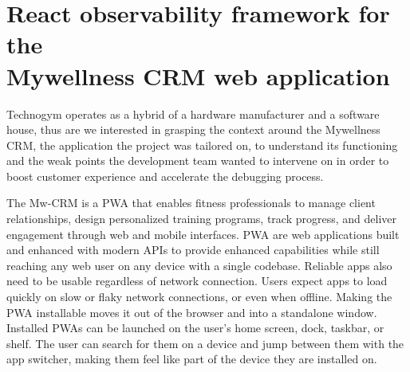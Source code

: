 \documentclass[12pt,a4paper,openright,twoside]{book}
\begin{document}
\section{React observability framework for the \\ Mywellness CRM web application}

Technogym operates as a hybrid of a hardware manufacturer and a software house, thus are we interested in grasping the context around the Mywellness CRM, the application the project was tailored on, to understand its functioning and the weak points the development team wanted to intervene on in order to boost customer experience and accelerate the debugging process. 

The Mw-CRM is a \ac{PWA} that enables fitness professionals to manage client relationships, design personalized training programs, track progress, and deliver engagement through web and mobile interfaces. \ac{PWA} \cite{webdev-pwa} are web applications built and enhanced with modern APIs to provide enhanced capabilities while still reaching any web user on any device with a single codebase. Reliable apps also need to be usable regardless of network connection. Users expect apps to load quickly on slow or flaky network connections, or even when offline. Making the PWA installable moves it out of the browser and into a standalone window. Installed PWAs can be launched on the user's home screen, dock, taskbar, or shelf. The user can search for them on a device and jump between them with the app switcher, making them feel like part of the device they are installed on.
\end{document}
